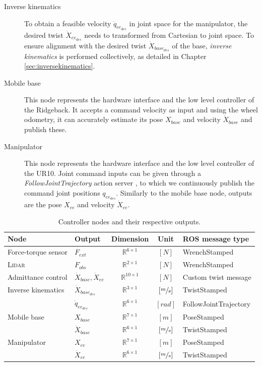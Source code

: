\begin{description}
  \item[Inverse kinematics] To obtain a feasible velocity $\dot{q}_{ee_{des}}$ in joint space for the manipulator, the desired twist $\dot{X}_{ee_{des}}$ needs to transformed from Cartesian to joint space. To ensure alignment with the desired twist $\dot{X}_{base_{des}}$ of the base, \emph{inverse kinematics} is performed collectively, as detailed in Chapter \ref{sec:inversekinematics}.
  
  \item[Mobile base] This node represents the hardware interface and the low level controller of the Ridgeback. It accepts a command velocity as input and using the wheel odometry, it can accurately estimate its pose $X_{base}$ and velocity $\dot{X}_{base}$ and publish these.
  \item[Manipulator] This node represents the hardware interface and the low level controller of the UR10. Joint command inputs can be given through a \emph{FollowJointTrajectory} action server \citep{rosJointTrajectory}, to which we continuously publish the command joint positions $q_{ee_{des}}$. Similarly to the mobile base node, outputs are the pose $X_{ee}$ and velocity $\dot{X}_{ee}$.
\end{description}

\begin{table}
\begin{center}
 \caption{Controller nodes and their respective outputs.}\vspace{1ex}
 \label{tab:controller_nodes}
 \begin{tabular}{l|lccl}
 \hline
Node & Output & Dimension & Unit & ROS message type \\ \hline \hline
Force-torque sensor & $F_{ext}$ & $\mathbb{R}^{6 \times 1}$ & $[N]$ & WrenchStamped \\
\textsc{Lidar} & $F_{obs}$ & $\mathbb{R}^{2 \times 1}$ & $[N]$ & WrenchStamped \\
Admittance control & $\dot{X}_{base},\dot{X}_{ee}$ & $\mathbb{R}^{10 \times 1}$ & $[N]$ & Custom twist message \\
Inverse kinematics & $\dot{X}_{base_{des}}$ & $\mathbb{R}^{3 \times 1}$  & $[\sfrac{m}{s}]$ & TwistStamped \\
& $\dot{q}_{ee_{des}}$&$\mathbb{R}^{6 \times 1}$ & $[rad]$ & FollowJointTrajectory\\
Mobile base & $X_{base}$ & $\mathbb{R}^{7 \times 1}$ & $[m]$ & PoseStamped \\
& $\dot{X}_{base}$ & $\mathbb{R}^{6 \times 1}$ & $[\sfrac{m}{s}]$ & TwistStamped \\
Manipulator & $X_{ee}$ & $\mathbb{R}^{7 \times 1}$ & $[m]$ & PoseStamped \\
& $\dot{X}_{ee}$ & $\mathbb{R}^{6 \times 1}$ & $[\sfrac{m}{s}]$ & TwistStamped \\


 \hline
 \end{tabular}
\end{center}
\end{table}

